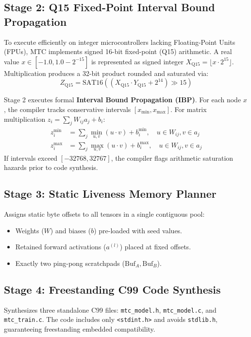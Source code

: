 \documentclass[conference]{IEEEtran}
\begin{document}
\subsection{Stage 2: Q15 Fixed-Point Interval Bound Propagation}
To execute efficiently on integer microcontrollers lacking Floating-Point Units (FPUs), MTC implements signed 16-bit fixed-point (Q15) arithmetic. A real value $x \in [-1.0, 1.0 - 2^{-15}]$ is represented as signed integer $X_{\text{Q15}} = \lfloor x \cdot 2^{15} \rfloor$. Multiplication produces a 32-bit product rounded and saturated via:
\begin{equation}
    Z_{\text{Q15}} = \text{SAT16}\left(\left(X_{\text{Q15}} \cdot Y_{\text{Q15}} + 2^{14}\right) \gg 15\right)
\end{equation}

Stage 2 executes formal \textbf{Interval Bound Propagation (IBP)}. For each node $x$, the compiler tracks conservative intervals $[x_{\min}, x_{\max}]$. For matrix multiplication $z_i = \sum_j W_{ij} a_j + b_i$:
\begin{align}
    z_i^{\min} &= \sum_j \min_{u, v}(u \cdot v) + b_i^{\min}, \quad u \in W_{ij}, v \in a_j \\
    z_i^{\max} &= \sum_j \max_{u, v}(u \cdot v) + b_i^{\max}, \quad u \in W_{ij}, v \in a_j
\end{align}
If intervals exceed $[-32768, 32767]$, the compiler flags arithmetic saturation hazards prior to code synthesis.

\subsection{Stage 3: Static Liveness Memory Planner}
Assigns static byte offsets to all tensors in a single contiguous pool:
\begin{itemize}
    \item Weights ($W$) and biases ($b$) pre-loaded with seed values.
    \item Retained forward activations ($a^{(l)}$) placed at fixed offsets.
    \item Exactly two ping-pong scratchpads ($\text{Buf}_A, \text{Buf}_B$).
\end{itemize}

\subsection{Stage 4: Freestanding C99 Code Synthesis}
Synthesizes three standalone C99 files: \texttt{mtc\_model.h}, \texttt{mtc\_model.c}, and \texttt{mtc\_train.c}. The code includes only \texttt{<stdint.h>} and avoids \texttt{stdlib.h}, guaranteeing freestanding embedded compatibility.
\end{document}
